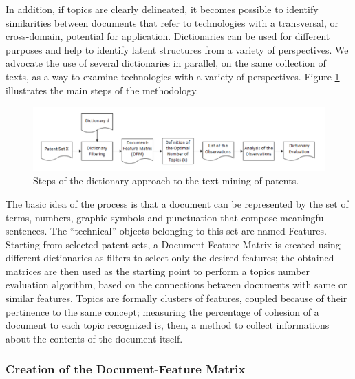 \documentclass[]{book}
\begin{document}
In addition, if topics are clearly delineated, it becomes possible to
identify similarities between documents that refer to technologies with
a transversal, or cross-domain, potential for application. Dictionaries
can be used for different purposes and help to identify latent
structures from a variety of perspectives. We advocate the use of
several dictionaries in parallel, on the same collection of texts, as a
way to examine technologies with a variety of perspectives. Figure
\ref{fig:dictwf} illustrates the main steps of the methodology.

\begin{figure}

{\centering \includegraphics[width=0.8\linewidth]{_bookdown_files/figures/dictwf} 

}

\caption{Steps of the dictionary approach to the text mining of patents.}\label{fig:dictwf}
\end{figure}

The basic idea of the process is that a document can be represented by
the set of terms, numbers, graphic symbols and punctuation that compose
meaningful sentences. The ``technical'' objects belonging to this set
are named Features. Starting from selected patent sets, a
Document-Feature Matrix is created using different dictionaries as
filters to select only the desired features; the obtained matrices are
then used as the starting point to perform a topics number evaluation
algorithm, based on the connections between documents with same or
similar features. Topics are formally clusters of features, coupled
because of their pertinence to the same concept; measuring the
percentage of cohesion of a document to each topic recognized is, then,
a method to collect informations about the contents of the document
itself.

\subsubsection*{Creation of the Document-Feature
Matrix}\label{creation-of-the-document-feature-matrix}
\end{document}
